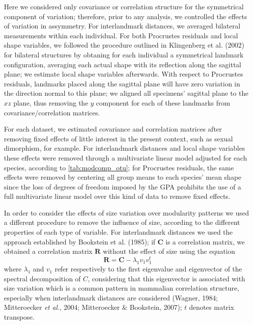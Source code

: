 \documentclass[12pt,twoside]{report}
\begin{document}
Here we considered only covariance or correlation structure for the
symmetrical component of variation; therefore, prior to any analysis, we
controlled the effects of variation in assymmetry. For interlandmark
distances, we averaged bilateral measurements within each individual.
For both Procrustes residuals and local shape variables, we followed the
procedure outlined in Klingenberg et al. (2002) for bilateral structures
by obtaning for each individual a symmetrical landmark configuration,
averaging each actual shape with its reflection along the sagittal
plane; we estimate local shape variables afterwards. With respect to
Procrustes residuals, landmarks placed along the sagittal plane will
have zero variation in the direction normal to this plane; we aligned
all specimens' sagittal plane to the $xz$ plane, thus removing the $y$
component for each of these landmarks from covariance/correlation
matrices.

For each dataset, we estimated covariance and correlation matrices after
removing fixed effects of little interest in the present context, such
as sexual dimorphism, for example. For interlandmark distances and local
shape variables these effects were removed through a multivariate linear
model adjusted for each species, according to \autoref{tab:modcomp_otu};
for Procrustes residuals, the same effects were removed by centering all
group means to each species' mean shape since the loss of degrees of
freedom imposed by the GPA prohibits the use of a full multivariate
linear model over this kind of data to remove fixed effects.

In order to consider the effects of size variation over modularity
patterns we used a different procedure to remove the influence of size,
according to the different properties of each type of variable. For
interlandmark distances we used the approach established by Bookstein et
al. (1985); if $\mathbf{C}$ is a correlation matrix, we obtained a
correlation matrix $\mathbf{R}$ without the effect of size using the
equation \[
\mathbf{R} = \mathbf{C} - \lambda_1 v_1 v^{t}_1
\] where $\lambda_1$ and $v_1$ refer respectively to the first
eigenvalue and eigenvector of the spectral decomposition of $C$,
considering that this eigenvector is associated with size variation
which is a common pattern in mammalian correlation structure, especially
when interlandmark distances are considered (Wagner, 1984; Mitteroecker
\emph{et al.}, 2004; Mitteroecker \& Bookstein, 2007); $t$ denotes
matrix transpose.
\end{document}
